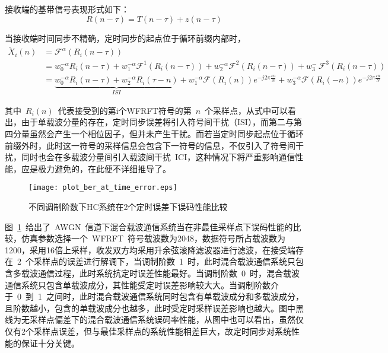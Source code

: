 接收端的基带信号表现形式如下：
\begin{equation}
R(n-\tau) = T(n-\tau) + z(n-\tau)
\end{equation}

当接收端时间同步不精确，定时同步的起点位于循环前缀内部时，
\begin{align}\label{}
\tilde X_i(n) &= {\mathcal{F}^\alpha }\left ( R_i\left ( n-\tau \right ) \right ) \nonumber \\
&= w_0^{- \alpha }R_i(n-\tau) + w_1^{- \alpha }{{\mathcal{F}^1}\left ( R_i\left ( n-\tau \right ) \right )}
+ w_2^{- \alpha }{{\mathcal{F}^2}\left ( R_i\left ( n-\tau \right ) \right )}
+ w_3^{- \ }{{\mathcal{F}^3}\left ( R_i\left ( n-\tau \right ) \right )} \nonumber \\
&= \underbrace {w_0^{- \alpha }R_i(n-\tau) + w_2^{- \alpha }R_i(\tau -n)}_{ISI} + w_1^{- \alpha }{{\mathcal{F}}\left ( R_i\left ( n \right ) \right )} {e^{-j2\pi \frac{{\varepsilon n}}{N}}} + w_3^{- \alpha }{{\mathcal{F}}\left ( R_i\left ( -n \right ) \right )} {e^{-j2\pi \frac{{\varepsilon n}}{N}}}
\end{align}

其中~$R_i(n)$~代表接受到的第i个WFRFT符号的第~$n$~个采样点，从式中可以看出，由于单载波分量的存在，定时同步误差将引入符号间干扰（ISI），而第二与第四分量虽然会产生一个相位因子，但并未产生干扰。而若当定时同步起点位于循环前缀外时，此时这一符号的采样信息会包含下一符号的信息，不仅引入了符号间干扰，同时也会在多载波分量间引入载波间干扰~ICI，这种情况下将严重影响通信性能，应是极力避免的，在此便不详细推导了。
\begin{figure}[htbp]
\centering
\texttt{[image: plot\_ber\_at\_time\_error.eps]}
\caption{不同调制阶数下HC系统在2个定时误差下误码性能比较}\vspace{-1em}\label{plot_ber_at_time_error}
\end{figure}

图~\ref{plot_ber_at_time_error}~给出了~AWGN~信道下混合载波通信系统当在非最佳采样点下误码性能的比较，仿真参数选择一个~WFRFT~符号载波数为2048，数据符号所占载波数为1200，采用16倍上采样，收发双方均采用升余弦滚降滤波器进行滤波，在接受端存在~2~个采样点的误差进行解调下，当调制阶数~1~时，此时混合载波通信系统只包含多载波通信过程，此时系统抗定时误差性能最好。当调制阶数~0~时，混合载波通信系统只包含单载波成分，其性能受定时误差影响较大大。当调制阶数介于~0~到~1~之间时，此时混合载波通信系统同时包含有单载波成分和多载波成分，且阶数越小，包含的单载波成分也越多，此时受定时采样误差影响也越大。图中黑线为无采样点偏差下的混合载波通信系统误码率性能，从图中也可以看出，虽然仅仅有2个采样点误差，但与最佳采样点的系统性能相差巨大，故定时同步对系统性能的保证十分关键。

